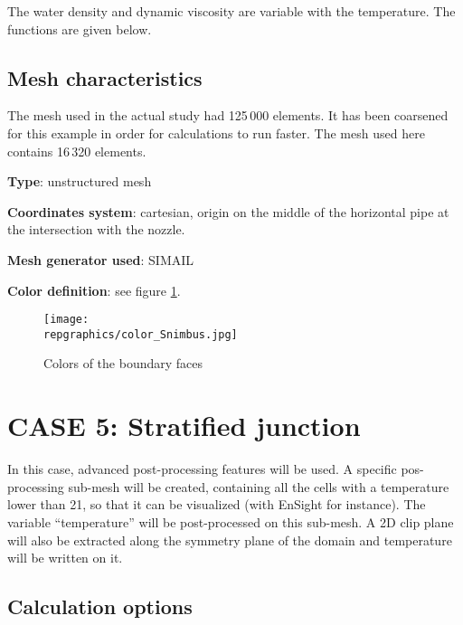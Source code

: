 The water density and dynamic viscosity are variable with the temperature. The
functions are given below.


        \subsection{Mesh characteristics}
The mesh used in the actual study had 125\,000 elements. It has been coarsened
for this example in order for calculations to run faster. The mesh used here
contains 16\,320 elements.

{\bfseries Type}: unstructured mesh

{\bfseries Coordinates system}: cartesian, origin on the middle of the horizontal pipe at the intersection with the nozzle.

{\bfseries Mesh generator used}: SIMAIL

{\bfseries Color definition}: see figure \ref{fige1_e5}.

\begin{figure}[h!]
\begin{center}
\texttt{[image: \\repgraphics/color\_Snimbus.jpg]}
\caption{Colors of the boundary faces}
\label{fige1_e5}
\end{center}
\end{figure}


\section{CASE 5: Stratified junction}
In this case, advanced post-processing features will be used. A specific
pos-processing sub-mesh will be created, containing all the cells with a
temperature lower than 21\degresC, so that it can be visualized (with EnSight
for instance). The variable ``temperature'' will be post-processed on this
sub-mesh. A 2D clip plane will also be extracted along the symmetry plane of the
domain and temperature will be written on it.


        \subsection{Calculation options}

